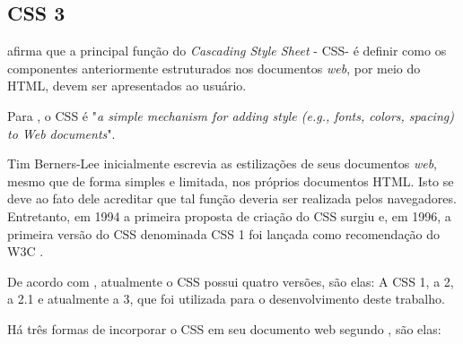 \subsection{CSS 3}

 afirma que a principal função do \textit{Cascading Style Sheet} - CSS\footnotemark[28] - é definir como os componentes anteriormente estruturados nos documentos \textit{web}, por meio do HTML, devem ser apresentados ao usuário.


Para , o CSS é "\textit{a simple mechanism for adding style (e.g., fonts, colors, spacing) to Web documents}\footnotemark[29]".


Tim Berners-Lee inicialmente escrevia as estilizações de seus documentos \textit{web}, mesmo que de forma simples e limitada, nos próprios documentos HTML. Isto se deve ao fato dele acreditar que tal função deveria ser realizada pelos navegadores. Entretanto, em 1994 a primeira proposta de criação do CSS surgiu e, em 1996, a primeira versão do CSS denominada CSS 1 foi lançada como recomendação do W3C \cite{silva_css_3}.

De acordo com , atualmente o CSS possui quatro versões, são elas: A CSS 1, a 2, a 2.1 e atualmente a 3, que foi utilizada para o desenvolvimento deste trabalho.

Há três formas de incorporar o CSS em seu documento web segundo \cite{silva_css_3}, são elas: 

